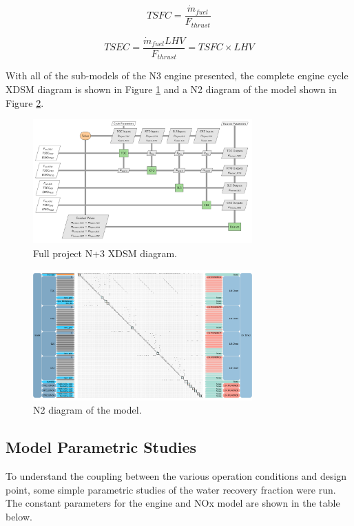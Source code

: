 \documentclass[12pt]{new-aiaa}
\begin{document}
\begin{equation}
    TSFC = \frac{\Dot{m}_{fuel}}{F_{thrust}}
\end{equation}

\begin{equation}
    TSEC = \frac{\Dot{m}_{fuel} LHV}{F_{thrust}} = TSFC \times LHV
\end{equation}

\noindent
With all of the sub-models of the N3 engine presented, the complete engine cycle XDSM diagram is shown in Figure \ref{fig:N3_xdsm_full} and a N2 diagram of the model shown in Figure \ref{fig:N3_n2}.

\begin{figure}[!hbt]
    \centering
    \includegraphics[width=0.75\textwidth]{N3_xdsm_full.pdf}
    \caption{Full project N+3 XDSM diagram.}
    \label{fig:N3_xdsm_full}
\end{figure}

\begin{figure}[!hbt]
    \centering
    \includegraphics[width=0.75\textwidth]{N3_CLVR_n2.pdf}
    \caption{N2 diagram of the model.}
    \label{fig:N3_n2}
\end{figure}

\subsection{Model Parametric Studies}
To understand the coupling between the various operation conditions and design point, some simple parametric studies of the water recovery fraction were run.
The constant parameters for the engine and NOx model are shown in the table below.
\end{document}
